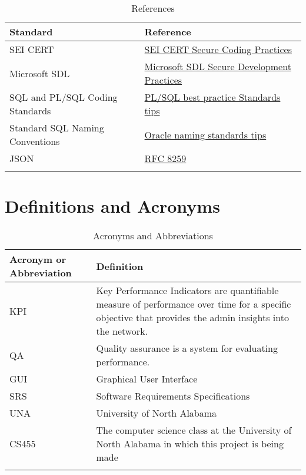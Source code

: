 \documentclass[letterpaper,12pt,oneside,listof=totoc]{scrreprt}
\begin{document}
\begin{longtable}{ p{} p{} } 
   \textbf{ Standard} & \textbf{Reference }\\
    \hline
    SEI CERT & \href{https://wiki.sei.cmu.edu/confluence/display/seccode}{SEI CERT Secure Coding Practices}\\
    \hline
    Microsoft SDL & \href{https://www.microsoft.com/en-us/securityengineering/sdl/practices}{Microsoft SDL Secure Development Practices}\\
    \hline   
    SQL and PL/SQL Coding Standards  & \href{http://www.dba-oracle.com/t_plsql_best_practices_standards.htm}{PL/SQL best practice Standards tips}\\
    \hline
    Standard SQL Naming Conventions & \href{http://www.dba-oracle.com/standards_schema_object_names.htm}{Oracle naming standards tips}\\
    \hline
    JSON &  \href{https://datatracker.ietf.org/doc/html/rfc8259}{RFC 8259}\\
    \hline    
\caption{References}
\end{longtable}

\section{Definitions and Acronyms}

\begin{longtable}{| p{} | p{} |} 
    \hline
   \textbf{ Acronym or Abbreviation} & \textbf{Definition}\\
    \hline
    KPI & Key Performance Indicators are quantifiable measure of performance over time for a specific objective that provides the admin insights into the network. \\
    \hline
    QA & Quality assurance is a system for evaluating performance. \\
    \hline
    GUI & Graphical User Interface\\
    \hline
    SRS & Software Requirements Specifications\\
    \hline
    UNA & University of North Alabama\\
    \hline
    CS455 & The computer science class at the University of North Alabama in which this project is being made\\
    \hline
\caption{Acronyms and Abbreviations}
\end{longtable}


\end{document}
